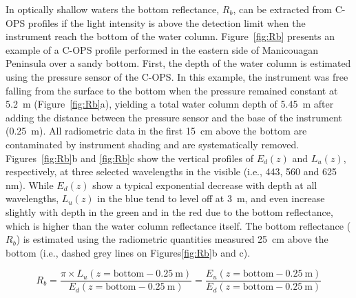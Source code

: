 \documentclass[essd, manuscript]{copernicus}
\begin{document}
In optically shallow waters the bottom reflectance, $R_b$,  can be extracted from C-OPS profiles if the light intensity is above the detection limit when the instrument reach the bottom of the water column. Figure~\ref{fig:Rb} presents an example of a C-OPS profile performed in the eastern side of Manicouagan Peninsula over a sandy bottom. First, the depth of the water column is estimated using the pressure sensor of the C-OPS. In this example, the instrument was free falling from the surface to the bottom when the pressure remained constant at 5.2~m (Figure~\ref{fig:Rb}a), yielding a total water column depth of 5.45~m after adding the distance between the pressure sensor and the base of the instrument (0.25~m). All radiometric data in the first 15~cm above the bottom are contaminated by instrument shading and are systematically removed. Figures~\ref{fig:Rb}b and \ref{fig:Rb}c show the vertical profiles of $E_d(z)$ and $L_u(z)$, respectively, at three selected wavelengths in the visible (i.e., 443, 560 and 625 nm). While $E_d(z)$ show a typical exponential decrease with depth at all wavelengths,  $L_u(z)$ in the blue tend to level off at 3~m, and even increase slightly with depth in the green and in the red due to the bottom reflectance, which is higher than the water column reflectance itself. The bottom reflectance ($R_b$) is estimated using the radiometric quantities measured 25~cm above the bottom (i.e., dashed grey lines on Figures\ref{fig:Rb}b and c).

\begin{equation}
    R_b = \frac{\pi \times L_u(z = \mathrm{bottom-0.25~m})}{E_d(z = \mathrm{bottom-0.25~m})} = \frac{E_u(z = \mathrm{bottom-0.25~m})}{E_d(z = \mathrm{bottom-0.25~m})}
\end{equation}
\end{document}
